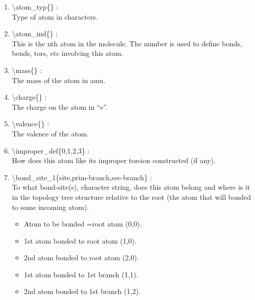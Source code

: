 \documentclass[12pt,titlepage]{article}
\begin{document}
\begin{enumerate}

 \vspace{0.15in} 
 \item  \textbackslash atom\_typ\{\} : \\ 
   Type of atom in characters.
 
 \vspace{0.15in} 
 \item  \textbackslash atom\_ind\{\} : \\ 
   This is the nth atom in the molecule. The number is used to 
   define bonds, bends, tors, etc involving this atom.

 \vspace{0.15in} 
 \item  \textbackslash mass\{\} : \\ 
    The mass of the atom in amu.

 \vspace{0.15in} 
 \item  \textbackslash charge\{\} : \\ 
    The charge on the atom in ``e''.

 \vspace{0.15in} 
 \item  \textbackslash valence\{\} : \\ 
    The valence of the atom.

 \vspace{0.15in} 
 \item  \textbackslash improper\_def\{0,1,2,3\} : \\ 
    How does this atom like its improper torsion constructed (if any).

 \vspace{0.15in} 
 \item  \textbackslash bond\_site\_1\{site,prim-branch,sec-branch\} : \\ 
    To what bond-site(s), character string, does this atom belong and where is
    it in the topology tree structure relative to the root (the atom
    that will bonded to some incoming atom).
      \begin{itemize}
        \item Atom to be bonded =root atom  (0,0).
        \item 1st atom bonded to root atom  (1,0).
        \item 2nd atom bonded to root atom  (2,0).
        \item 1st atom bonded to 1st branch (1,1).
        \item 2nd atom bonded to 1st branch (1,2).
      \end{itemize}



\end{enumerate}
\end{document}
